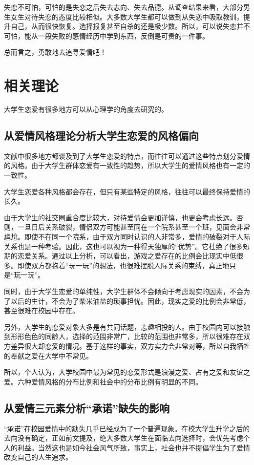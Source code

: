 \documentclass[UTF8,a4paper]{ctexart}
\begin{document}
失恋不可怕，可怕的是失恋之后失去志向、失去品德。从调查结果来看，大部分男生女生对待失恋的态度比较相似。大多数大学生都可以做到从失恋中吸取教训，提升自己，从而很快恢复。选择报复甚至自杀的还是极少数。所以，可以说失恋并不可怕，能从一段失败的感情经历中学到东西，反倒是可贵的一件事。

总而言之，勇敢地去追寻爱情吧！

\section{相关理论}
大学生恋爱有很多地方可以从心理学的角度去研究的。

\subsection{从爱情风格理论分析大学生恋爱的风格偏向}
文献中很多地方都谈及到了大学生恋爱的特点，而往往可以通过这些特点划分爱情的风格。由于大学生群体恋爱有一致性的趋势，所以大学生的爱情风格也有一定的一致性。

大学生恋爱各种风格都会存在，但只有某些特定的风格，往往可以最终保持爱情的长久。

由于大学生的社交圈重合度比较大，对待爱情会更加谨慎，也更会考虑长远。否则，一旦日后关系破裂，情侣双方可能甚至同在一个院系甚至一个班，见面会非常尴尬。即使不在同一个院系，由于双方同时认识的人非常多，爱情的破裂对于人际关系也是一种考验。因此，这也可以视为一种得天独厚的“优势”。它杜绝了很多短期的恋爱关系。通过以上分析，可以看出，游戏之爱存在的比例会比现实中低很多。即使双方都抱着“玩一玩”的想法，也很难摆脱人际关系的束缚，真正地只是“玩一玩”。

同时，由于大学生恋爱的单纯性，大学生群体不会倾向于考虑现实的因素，不会为了以后的生计，不会为了柴米油盐的琐事担忧。因此，现实之爱的比例会非常低，甚至很难在校园中存在。

另外，大学生的恋爱对象大多是有共同话题，志趣相投的人。由于校园内可以接触到形形色色的同龄人，选择的范围非常广，比较的范围也非常多，所以很难存在双方差异很大却恋爱的情况。基于这样的事实，双方实力会非常对等，所以自我牺牲的奉献之爱在大学中不常见。

所以，个人认为，大学校园中最为常见的恋爱形式是浪漫之爱、占有之爱和友谊之爱。六种爱情风格的分布比例和社会中的分布比例有明显的不同。

\subsection{从爱情三元素分析“承诺”缺失的影响}
“承诺”在校园爱情中的缺失几乎已经成为了一个普遍现象。在校大学生升学之后的去向没有确定，正如前文提及，绝大多数大学生在面临去向选择时，会优先考虑个人的利益。当然这也是如今社会风气所致，事实上，社会也并不提倡学生为了爱情改变自己的人生追求。
\end{document}

